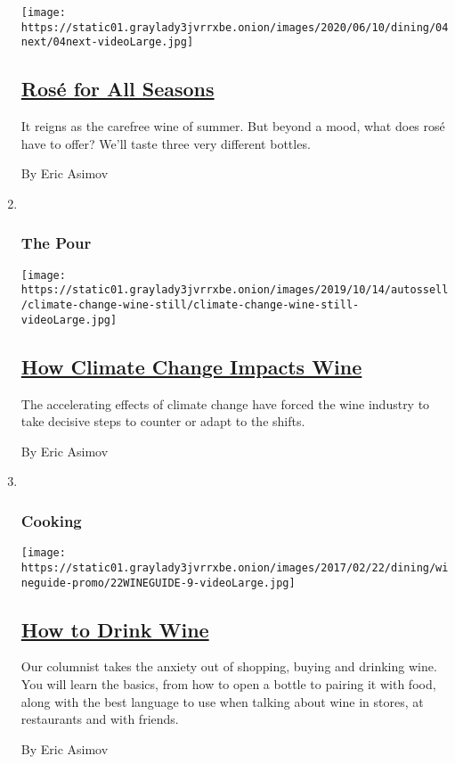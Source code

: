 \begin{enumerate}
  \texttt{[image: https://static01.graylady3jvrrxbe.onion/images/2020/06/10/dining/04next/04next-videoLarge.jpg]}

  \hypertarget{rosuxe9-for-all-seasons}{%
  \subsection{\texorpdfstring{\href{/2020/06/04/dining/drinks/wine-school-assignment-rose.html}{Rosé
  for All
  Seasons}}{Rosé for All Seasons}}\label{rosuxe9-for-all-seasons}}

  It reigns as the carefree wine of summer. But beyond a mood, what does
  rosé have to offer? We'll taste three very different bottles.

  By Eric Asimov
\item ~
  \hypertarget{the-pour-2}{%
  \subsubsection{The Pour}\label{the-pour-2}}

  \texttt{[image: https://static01.graylady3jvrrxbe.onion/images/2019/10/14/autossell/climate-change-wine-still/climate-change-wine-still-videoLarge.jpg]}

  \hypertarget{how-climate-change-impacts-wine}{%
  \subsection{\texorpdfstring{\href{/interactive/2019/10/14/dining/drinks/climate-change-wine.html}{How
  Climate Change Impacts
  Wine}}{How Climate Change Impacts Wine}}\label{how-climate-change-impacts-wine}}

  The accelerating effects of climate change have forced the wine
  industry to take decisive steps to counter or adapt to the shifts.

  By Eric Asimov
\item ~
  \hypertarget{cooking}{%
  \subsubsection{Cooking}\label{cooking}}

  \texttt{[image: https://static01.graylady3jvrrxbe.onion/images/2017/02/22/dining/wineguide-promo/22WINEGUIDE-9-videoLarge.jpg]}

  \hypertarget{how-to-drink-wine}{%
  \subsection{\texorpdfstring{\href{/interactive/2018/11/28/dining/drinks/how-to-drink-wine.html}{How
  to Drink Wine}}{How to Drink Wine}}\label{how-to-drink-wine}}

  Our columnist takes the anxiety out of shopping, buying and drinking
  wine. You will learn the basics, from how to open a bottle to pairing
  it with food, along with the best language to use when talking about
  wine in stores, at restaurants and with friends.

  By Eric Asimov
\end{enumerate}

